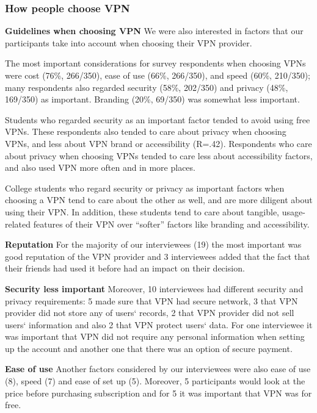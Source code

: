 \subsubsection{How people choose VPN} 
\label{sec:findings-choosing}
\textbf{Guidelines when choosing VPN}
We were also interested in factors that our participants take into account when choosing their VPN provider.

The most important considerations for survey respondents when choosing VPNs were cost (76\%, 266/350), ease of use (66\%, 266/350), and speed (60\%, 210/350); many respondents also regarded security (58\%, 202/350) and privacy (48\%, 169/350) as important. Branding (20\%, 69/350) was somewhat less important.

Students who regarded security as an important factor tended to avoid using free VPNs. These respondents also tended to care about privacy when choosing VPNs, and less about VPN brand or accessibility (R=.42). Respondents who care about privacy when choosing VPNs tended to care less about accessibility factors, and also used VPN more often and in more places.

College students who regard security or privacy as important factors when choosing a VPN tend to care about the other as well, and are more diligent about using their VPN. In addition, these students tend to care about tangible, usage-related features of their VPN over “softer” factors like branding and accessibility.


\textbf{Reputation} For the majority of our interviewees (19) the most important was good reputation of the VPN provider and 3 interviewees added that the fact that their friends had used it before had an impact on their decision. 

\textbf{Security less important} Moreover, 10 interviewees had different security and privacy requirements: 5 made sure that VPN had secure network, 3 that VPN provider did not store any of users‘ records, 2 that VPN provider did not sell users‘ information and also 2 that VPN protect users‘ data. For one interviewee it was important that VPN did not require any personal information when setting up the account and another one that there was an option of secure payment. 

\textbf{Ease of use} Another factors considered by our interviewees were also ease of use (8), speed (7) and ease of set up (5). Moreover, 5 participants would look at the price before purchasing subscription and for 5 it was important that VPN was for free.   


